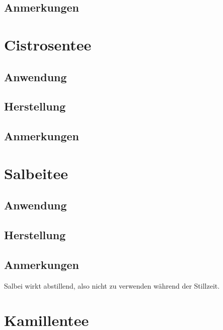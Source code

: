 \subsection{Anmerkungen}





\section{Cistrosentee}


\subsection{Anwendung}

\subsection{Herstellung}

\subsection{Anmerkungen}




\section{Salbeitee}

  

\subsection{Anwendung}

\subsection{Herstellung}

\subsection{Anmerkungen}

Salbei wirkt abstillend, also nicht zu verwenden während der Stillzeit.





\section{Kamillentee}

